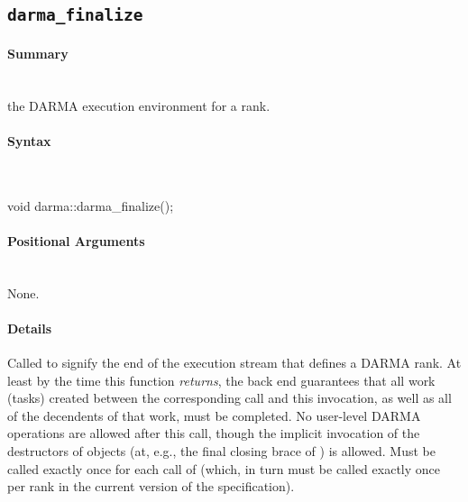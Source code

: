 
\subsection{\texttt{darma\_finalize}}
\label{ssec:api_fe_finalize}

\paragraph{Summary}\mbox{}\\
 the \gls{DARMA} execution environment for a \gls{rank}.

\paragraph{Syntax}\mbox{}\\ 
\begin{CppCode}
void darma::darma_finalize();
\end{CppCode}

\paragraph{Positional Arguments}\mbox{} \\
None. 

\paragraph{Details}\mbox{} 
Called to signify the end of the \gls{execution stream} that defines a
\gls{DARMA} \gls{rank}.  At least by the time this function {\em returns}, the
back end guarantees that all work (\glspl{task}) created between the corresponding  call and this
invocation, as well as all of the decendents of that work, must be
completed.  No user-level \gls{DARMA} operations are allowed after this call, though
the implicit invocation of the destructors of  objects
(at, e.g., the final closing brace of ) is allowed.  Must
be called exactly once for each call of  (which, in turn
must be called exactly once per \gls{rank} in the current version of the
specification).

